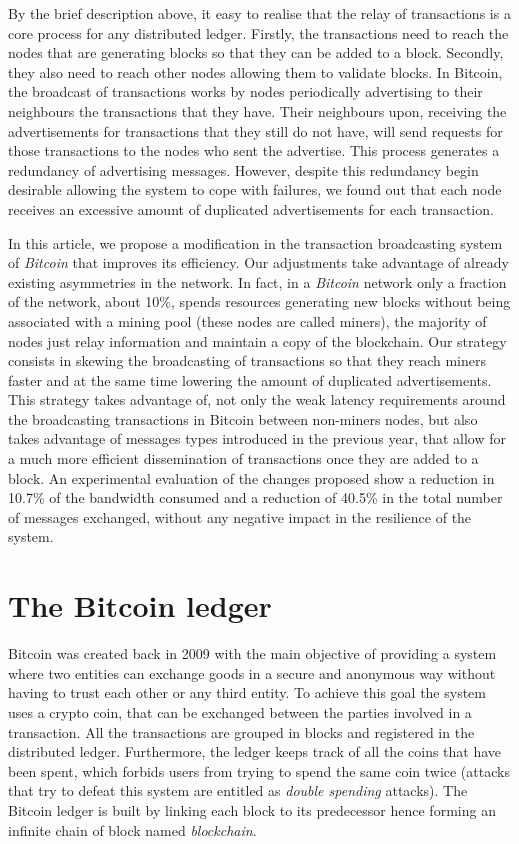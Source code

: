 \documentclass{dads}   %
\begin{document}
By the brief description above, it easy to realise that the relay of transactions is a core process for any distributed ledger. Firstly, the transactions need to reach the nodes that are generating blocks so that they can be added to a block. Secondly, they also need to reach other nodes allowing them to validate blocks. In Bitcoin, the broadcast of transactions works by nodes periodically advertising to their neighbours the transactions that they have. Their neighbours upon, receiving the advertisements for transactions that they still do not have, will send requests for those transactions to the nodes who sent the advertise. This process generates a redundancy of advertising messages. However, despite this redundancy begin desirable allowing the system to cope with failures, we found out that each node receives an excessive amount of duplicated advertisements for each transaction.

In this article, we propose a modification in the transaction broadcasting system of \textit{Bitcoin} that improves its efficiency. Our adjustments take advantage of already existing asymmetries in the network. In fact, in a \textit{Bitcoin} network only a fraction of the network, about 10\%, spends resources generating new blocks without being associated with a mining pool (these nodes are called miners), the majority of nodes just relay information and maintain a copy of the blockchain. Our strategy consists in skewing the broadcasting of transactions so that they reach miners faster and at the same time lowering the amount of duplicated advertisements. This strategy takes advantage of, not only the weak latency requirements around the broadcasting transactions in Bitcoin between non-miners nodes, but also takes advantage of messages types introduced in the previous year, that allow for a much more efficient dissemination of transactions once they are added to a block. An experimental evaluation of the changes proposed show a reduction in 10.7\% of the bandwidth consumed and a reduction of 40.5\% in the total number of messages exchanged, without any negative impact in the resilience of the system.

\section{The {\secit Bitcoin} ledger}
Bitcoin was created back in 2009 with the main objective of providing a system where two entities can exchange goods in a secure and anonymous way without having to trust each other or any third entity. To achieve this goal the system uses a crypto coin, that can be exchanged between the parties involved in a transaction. All the transactions are grouped in blocks and registered in the distributed ledger. Furthermore, the ledger keeps track of all the coins that have been spent, which forbids users from trying to spend the same coin twice (attacks that try to defeat this system are entitled as \textit{double spending} attacks). The Bitcoin ledger is built by linking each block to its predecessor hence forming an infinite chain of block named \textit{blockchain}.
\end{document}
